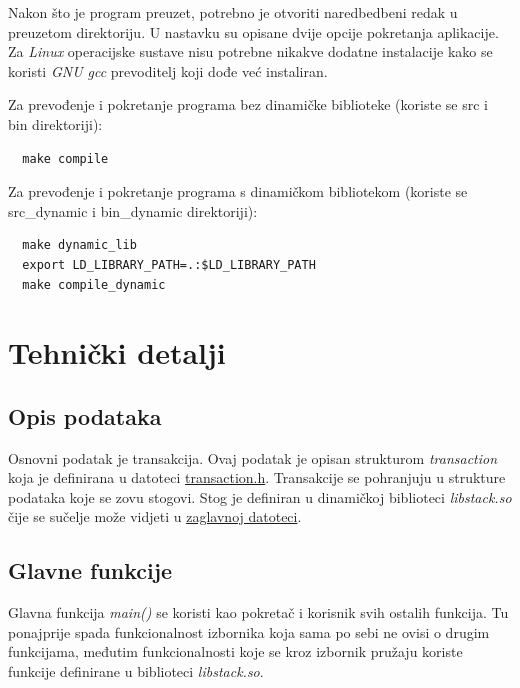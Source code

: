 \documentclass[12pt, letterpaper]{article}
\begin{document}
  Nakon što je program preuzet, potrebno je otvoriti naredbedbeni redak u preuzetom direktoriju. U nastavku su opisane dvije opcije pokretanja aplikacije. Za \textit{Linux} operacijske sustave nisu potrebne nikakve dodatne instalacije kako se koristi \textit{GNU gcc} prevoditelj koji dođe već instaliran.
    
  Za prevođenje i pokretanje programa bez dinamičke biblioteke (koriste se src i bin direktoriji): 
  \begin{verbatim}
  make compile
  \end{verbatim}

  Za prevođenje i pokretanje programa s dinamičkom bibliotekom (koriste se src\_dynamic i bin\_dynamic direktoriji): 

  \begin{verbatim}
  make dynamic_lib
  export LD_LIBRARY_PATH=.:$LD_LIBRARY_PATH 
  make compile_dynamic
  \end{verbatim}

  \section{Tehnički detalji}
  
  \subsection{Opis podataka}
  Osnovni podatak je transakcija. Ovaj podatak je opisan strukturom \textit{transaction} koja je definirana u datoteci \hyperref[struct_transaction]{transaction.h}. Transakcije se pohranjuju u strukture podataka koje se zovu stogovi. Stog je definiran u dinamičkoj biblioteci \textit{libstack.so} čije se sučelje može vidjeti u \hyperref[stack.h]{zaglavnoj datoteci}. 
 
  \subsection{Glavne funkcije} 
  Glavna funkcija \textit{main()} se koristi kao pokretač i korisnik svih ostalih funkcija. Tu ponajprije spada funkcionalnost izbornika koja sama po sebi ne ovisi o drugim funkcijama, međutim funkcionalnosti koje se kroz izbornik pružaju koriste funkcije definirane u biblioteci \textit{libstack.so}.
\end{document}
